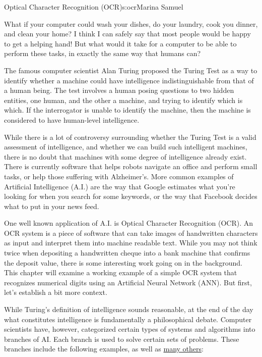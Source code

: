 \begin{aosachapter}{Optical Character Recognition (OCR)}{s:ocr}{Marina Samuel}

\label{introduction}

What if your computer could wash your dishes, do your laundry, cook you
dinner, and clean your home? I think I can safely say that most people
would be happy to get a helping hand! But what would it take for a
computer to be able to perform these tasks, in exactly the same way that
humans can?

The famous computer scientist Alan Turing proposed the Turing Test as a
way to identify whether a machine could have intelligence
indistinguishable from that of a human being. The test involves a human
posing questions to two hidden entities, one human, and the other a
machine, and trying to identify which is which. If the interrogator is
unable to identify the machine, then the machine is considered to have
human-level intelligence.

While there is a lot of controversy surrounding whether the Turing Test
is a valid assessment of intelligence, and whether we can build such
intelligent machines, there is no doubt that machines with some degree
of intelligence already exist. There is currently software that helps
robots navigate an office and perform small tasks, or help those
suffering with Alzheimer's. More common examples of Artificial
Intelligence (A.I.) are the way that Google estimates what you're
looking for when you search for some keywords, or the way that Facebook
decides what to put in your news feed.

One well known application of A.I. is Optical Character Recognition
(OCR). An OCR system is a piece of software that can take images of
handwritten characters as input and interpret them into machine readable
text. While you may not think twice when depositing a handwritten cheque
into a bank machine that confirms the deposit value, there is some
interesting work going on in the background. This chapter will examine a
working example of a simple OCR system that recognizes numerical digits
using an Artificial Neural Network (ANN). But first, let's establish a
bit more context.

\label{what-is-artificial-intelligence}

\label{sec.ocr.ai} While Turing's definition of intelligence sounds
reasonable, at the end of the day what constitutes intelligence is
fundamentally a philosophical debate. Computer scientists have, however,
categorized certain types of systems and algorithms into branches of AI.
Each branch is used to solve certain sets of problems. These branches
include the following examples, as well as
\href{http://www-formal.stanford.edu/jmc/whatisai/node2.html}{many
others}:


\end{aosachapter}
